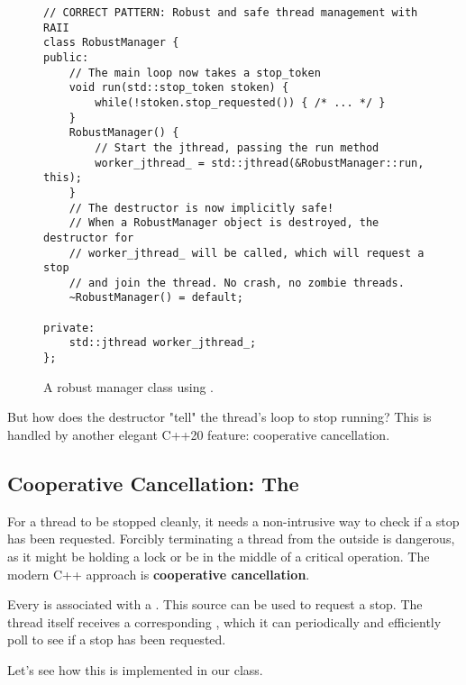 \begin{figure}[H]
\captionsetup{type=lstlisting}
\setlength{\abovecaptionskip}{-15pt}
\begin{verbatim}
// CORRECT PATTERN: Robust and safe thread management with RAII
class RobustManager {
public:
    // The main loop now takes a stop_token
    void run(std::stop_token stoken) {
        while(!stoken.stop_requested()) { /* ... */ }
    }
    RobustManager() {
        // Start the jthread, passing the run method
        worker_jthread_ = std::jthread(&RobustManager::run, this);
    }
    // The destructor is now implicitly safe!
    // When a RobustManager object is destroyed, the destructor for
    // worker_jthread_ will be called, which will request a stop
    // and join the thread. No crash, no zombie threads.
    ~RobustManager() = default;

private:
    std::jthread worker_jthread_;
};
\end{verbatim}
\caption{A robust manager class using .}
\label{lst:robust-jthread}
\end{figure}

But how does the destructor "tell" the thread's loop to stop running? This is handled by another elegant C++20 feature: cooperative cancellation.

\subsection{Cooperative Cancellation: The }
\label{subsec:stop_token}

For a thread to be stopped cleanly, it needs a non-intrusive way to check if a stop has been requested. Forcibly terminating a thread from the outside is dangerous, as it might be holding a lock or be in the middle of a critical operation. The modern C++ approach is \textbf{cooperative cancellation}.

Every  is associated with a \textbf{}. This source can be used to request a stop. The thread itself receives a corresponding \textbf{}, which it can periodically and efficiently poll to see if a stop has been requested.

Let's see how this is implemented in our  class.


